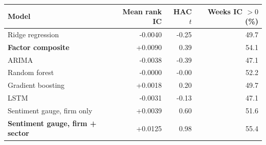 \begin{tabular}{lrrr}
\toprule
Model & Mean rank IC & HAC $t$ & Weeks IC $>0$ (\%) \\
\midrule
Ridge regression & -0.0040 & -0.25 & 49.7 \\
\textbf{Factor composite} & +0.0090 & 0.39 & 54.1 \\
ARIMA & -0.0038 & -0.39 & 47.1 \\
Random forest & -0.0000 & -0.00 & 52.2 \\
Gradient boosting & +0.0018 & 0.20 & 49.7 \\
LSTM & -0.0031 & -0.13 & 47.1 \\
\midrule
Sentiment gauge, firm only & +0.0039 & 0.60 & 51.6 \\
\textbf{Sentiment gauge, firm + sector} & +0.0125 & 0.98 & 55.4 \\
\bottomrule
\end{tabular}

